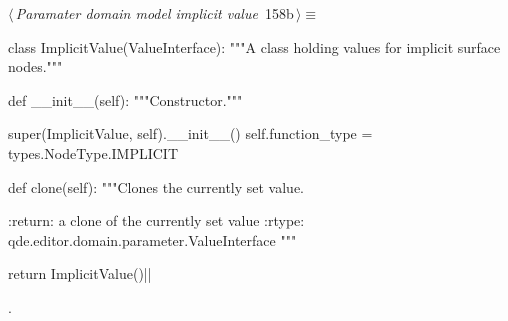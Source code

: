 \documentclass[%
    a4paper,    %
    justified,  %
    nobib,      %
    openany     %
]{tufte-book}
\begin{document}
\begin{flushleft} \small
\begin{minipage}{\linewidth}\label{scrap186}\raggedright\small
{} $\langle\,${\itshape Paramater domain model implicit value}\nobreak\ {\footnotesize {158b}}$\,\rangle\equiv$
\vspace{-1ex}
\begin{pythoncode}
class ImplicitValue(ValueInterface):
    """A class holding values for implicit surface nodes."""

    def __init__(self):
        """Constructor."""

        super(ImplicitValue, self).__init__()
        self.function_type = types.NodeType.IMPLICIT

    def clone(self):
        """Clones the currently set value.

        :return: a clone of the currently set value
        :rtype:  qde.editor.domain.parameter.ValueInterface
        """

        return ImplicitValue()|\NWsep|
\end{pythoncode}
\vspace{1.5ex}
\footnotesize
\begin{list}{}{\setlength{\itemsep}{-\parsep}\setlength{\itemindent}{-\leftmargin}}
\item {\NWtxtMacroNoRef}.

\item{}
\end{list}
\end{minipage}\vspace{4ex}
\end{flushleft}
\end{document}
